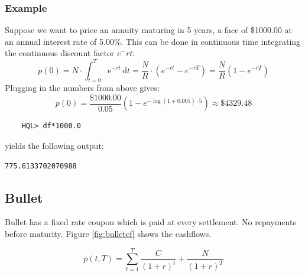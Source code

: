 \documentclass[11pt,a4paper]{article}
\numberwithin{equation}{section}
\begin{document}
	\subsubsection{Example}
	Suppose we want to price an annuity maturing in 5 years, a face of \$1000.00 at an annual interest rate of 5.00\%.
	This can be done in continuous time integrating the continuous discount factor $e^-rt$:
	\[
	p(0)=N\cdot \int_{t=0}^T \mathrm{e}^{-rt}\,\mathrm{d}t=\frac{N}{R}\cdot (e^{-rt}-e^{-rT})=\frac{N}{R}(1-e^{-rT})
	\]
	Plugging in the numbers from above gives:
	\[
	p(0)=\frac{\$1000.00}{0.05}(1-e^{-\log(1+0.005)\cdot 5})\approx \$4329.48
	\]
	\begin{lstlisting}
	HQL> df*1000.0
	\end{lstlisting}
	yields the following output:
	\FrameSep
	\begin{lstlisting}[style=Output]
	775.6133702070988
	\end{lstlisting}

	\subsection{Bullet}

	Bullet has a fixed rate coupon which is paid at every settlement. No repayments before maturity. Figure \ref{fig:bulletcf} shows the cashflows.

	\[ p(t,T) = \sum_{t=1}^{T}\frac{C}{(1+r)^t} + \frac{N}{(1+r)^T} \]
\end{document}

